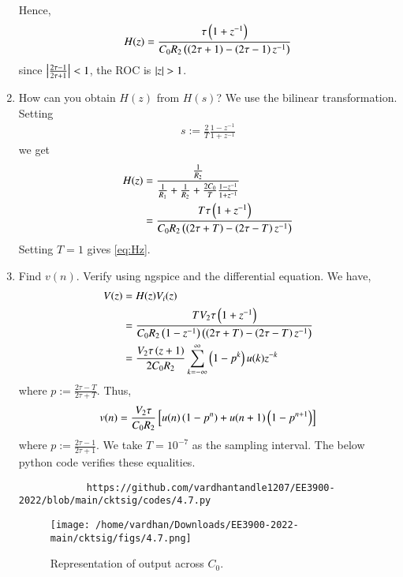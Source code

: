 \documentclass[journal,12pt,twocolumn]{IEEEtran}
\renewcommand\thesection{\arabic{section}}
\begin{document}
\begin{enumerate}[label=\arabic*.,ref=\thesection.\theenumi]
\begin{align}
		\end{align}
		Hence,
		\begin{align}
			H(z) = \frac{\tau\left(1+z^{-1}\right)}{C_0R_2\left(\left(2\tau+1\right)-\left(2\tau-1\right)z^{-1}\right)}
			\label{eq:Hz}
		\end{align}
		since $\left\vert\frac{2\tau-1}{2\tau+1}\right\vert < 1$, the ROC is $\left\vert z\right\vert > 1$.
		\item How can you obtain $H(z)$ from $H(s)$?
		\solution We use the bilinear transformation. Setting
		\begin{align}
			s := \frac{2}{T}\frac{1 - z^{-1}}{1 + z^{-1}}
		\end{align}
		we get
		\begin{align}
			H(z) &= \frac{\frac{1}{R_2}}{\frac{1}{R_1} + \frac{1}{R_2} + \frac{2C_0}{T}\frac{1 - z^{-1}}{1 + z^{-1}}} \\
			&= \frac{T\tau\left(1+z^{-1}\right)}{C_0R_2\left(\left(2\tau+T\right)-\left(2\tau-T\right)z^{-1}\right)}
		\end{align}
		Setting $T = 1$ gives \eqref{eq:Hz}.
		\item Find $v(n)$. Verify using ngspice and the differential equation.
		\solution We have,
		\begin{align}
			V(z) &= H(z)V_i(z) \\
			&= \frac{TV_2\tau\left(1+z^{-1}\right)}{C_0R_2\left(1-z^{-1}\right)\left(\left(2\tau+T\right)-\left(2\tau-T\right)z^{-1}\right)} \\
			&= \frac{V_2\tau\left(z+1\right)}{2C_0R_2}\sum_{k=-\infty}^{\infty}\left(1-p^k\right)u(k)z^{-k}
		\end{align}
		where $p := \frac{2\tau-T}{2\tau+T}$. Thus,
		\begin{align}
			v(n) = \frac{V_2\tau}{C_0R_2}{}\left[u(n)\left(1-p^n\right)+u(n+1)\left(1-p^{n+1}\right)\right]
		\end{align}
		where $p := \frac{2\tau-1}{2\tau+1}$. We take $T = 10^{-7}$ as the
		sampling interval. The below python code verifies
		these equalities.
		\begin{lstlisting}
			https://github.com/vardhantandle1207/EE3900-2022/blob/main/cktsig/codes/4.7.py
		\end{lstlisting}
		\begin{figure}
			\texttt{[image: /home/vardhan/Downloads/EE3900-2022-main/cktsig/figs/4.7.png]}
			\caption{Representation of output across $C_0$.}
			\label{fig:vc0}
		\end{figure}
	\end{enumerate}
\end{document}

